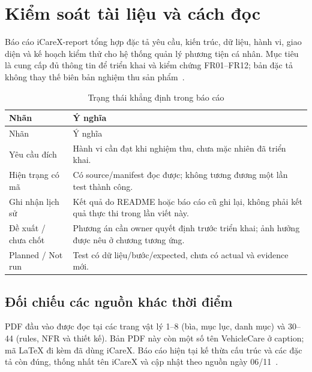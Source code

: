 \chapter*{Kiểm soát tài liệu và cách đọc}
Báo cáo iCareX-report tổng hợp đặc tả yêu cầu, kiến trúc, dữ liệu, hành vi, giao diện và kế hoạch kiểm thử cho hệ thống quản lý phương tiện cá nhân. Mục tiêu là cung cấp đủ thông tin để triển khai và kiểm chứng FR01--FR12; bản đặc tả không thay thế biên bản nghiệm thu sản phẩm~\cite{wiki,design}.


\begin{smalltable}\begin{longtable}{L{3cm}L{12cm}}
\caption{Trạng thái khẳng định trong báo cáo}\\
\toprule Nhãn & Ý nghĩa\\\midrule\endfirsthead
\toprule Nhãn & Ý nghĩa\\\midrule\endhead
Yêu cầu đích & Hành vi cần đạt khi nghiệm thu, chưa mặc nhiên đã triển khai.\\
Hiện trạng có mã & Có source/manifest đọc được; không tương đương một lần test thành công.\\
Ghi nhận lịch sử & Kết quả do README hoặc báo cáo cũ ghi lại, không phải kết quả thực thi trong lần viết này.\\
Đề xuất / chưa chốt & Phương án cần owner quyết định trước triển khai; ảnh hưởng được nêu ở chương tương ứng.\\
Planned / Not run & Test có dữ liệu/bước/expected, chưa có actual và evidence mới.\\\bottomrule
\end{longtable}\end{smalltable}

\section*{Đối chiếu các nguồn khác thời điểm}
PDF đầu vào  được đọc tại các trang vật lý 1--8 (bìa, mục lục, danh mục) và 30--44 (rules, NFR và thiết kế). Bản PDF này còn một số tên VehicleCare ở caption; mã LaTeX đi kèm đã dùng iCareX. Báo cáo hiện tại kế thừa cấu trúc và các đặc tả còn đúng, thống nhất tên iCareX và cập nhật theo nguồn ngày 06/11~\cite{previousreport}.

